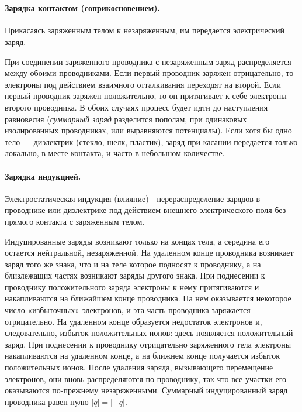 \documentclass[a4paper,12pt]{article}
\begin{document}
		\

		\paragraph{Зарядка контактом (соприкосновением).}
		Прикасаясь заряженным телом к незаряженным, им передается электрический
		заряд.

		При соединении заряженного проводника с незаряженным заряд распределяется
		между обоими проводниками. Если первый проводник заряжен отрицательно, то 
		электроны под действием взаимного отталкивания переходят на второй. Если 
		первый проводник заряжен положительно, то он притягивает к себе электроны
		второго проводника. В обоих случаях процесс будет идти до наступления 
		равновесия (\textit{суммарный заряд} разделится пополам, при одинаковых 
		изолированных проводниках, или выравняются потенциалы).
		Если хотя бы одно тело — диэлектрик (стекло, шелк, пластик), заряд при 
		касании передается только локально, в месте контакта, и часто в небольшом
		количестве.


		\paragraph{Зарядка индукцией.}

		Электростатическая индукция (влияние) - перераспределение зарядов в проводнике
		или диэлектрике под действием внешнего электрического поля без прямого контакта
		с заряженным телом.

		Индуцированные заряды возникают только на концах тела, а середина его остается 
		нейтральной, незаряженной. На удаленном конце проводника возникает заряд того 
		же знака, что и на теле которое подносят к проводнику, а на близлежащих частях
		возникают заряды другого знака. При поднесении к проводнику положительного заряда
		электроны к нему притягиваются и накапливаются на ближайшем конце проводника. 
		На нем оказывается некоторое число «избыточных» электронов, и эта часть проводника
		заряжается отрицательно. На удаленном конце образуется недостаток электронов и, 
		следовательно, избыток положительных ионов: здесь появляется положительный заряд.
		При поднесении к проводнику отрицательно заряженного тела электроны накапливаются
		на удаленном конце, а на ближнем конце получается избыток положительных ионов. 
		После удаления заряда, вызывающего перемещение электронов, они вновь распределяются
		по проводнику, так что все участки его оказываются по-прежнему незаряженными.
		Суммарный индуцированный заряд проводника равен нулю $|q|=|-q|$.
\end{document}
